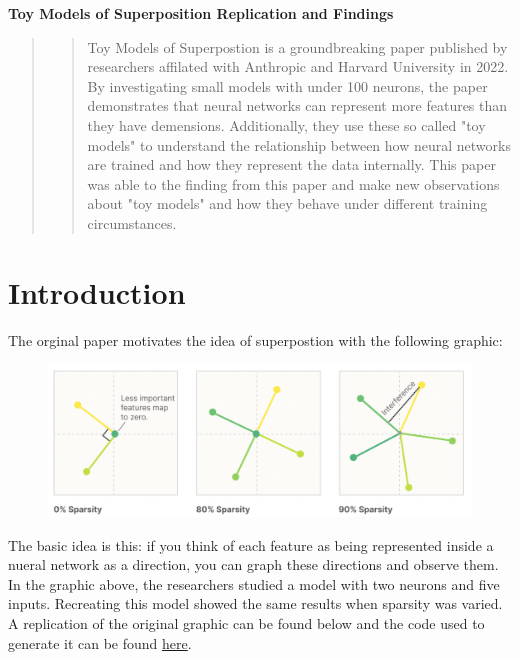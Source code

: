 \documentclass{article} %
\begin{document}


\noindent\makebox[\linewidth]{\rule{\textwidth}{1pt}} 
\vspace*{0mm} %
\begin{center}
    \Large\textbf{Toy Models of Superposition Replication and Findings}
\end{center}
\vspace*{2mm} %
\noindent\makebox[\linewidth]{\rule{\textwidth}{1pt}}
\newline

\begin{abstract}
\begin{quote}
    Toy Models of Superpostion\cite{elhage2022toy} is a groundbreaking paper published by 
    researchers affilated with Anthropic and Harvard University in 2022. By 
    investigating small models with under 100 neurons, the paper demonstrates 
    that neural networks can represent more features than they have demensions. 
    Additionally, they use these so called "toy models" to understand the 
    relationship between how neural networks are trained and how they represent 
    the data internally. This paper was able to the finding from this paper and 
    make new observations about "toy models" and how they behave under different 
    training circumstances.
\end{quote}
\end{abstract}


\section{Introduction}

The orginal paper motivates the idea of superpostion with the following graphic:

\begin{figure}[h]
    \centering
    \includegraphics[width=0.61\linewidth]{section_1/images/section1_anthropic_graphic_.png}
    \captionsetup{font=footnotesize} %
    \label{fig:section1_anthropic}
\end{figure}
The basic idea is this: if you think of each feature as being represented inside a
nueral network as a direction, you can graph these directions and observe them.
In the graphic above, the researchers studied a model with two neurons and five inputs.
Recreating this model showed the same results when sparsity was varied. A replication
of the original graphic can be found below and the code used to generate it can be found \href{http://www.example.com}{here}. 
\end{document}
